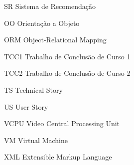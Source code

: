 \begin{siglas}
  \item[SR] Sistema de Recomendação
  \item[OO] Orientação a Objeto
  \item[ORM] Object-Relational Mapping
  \item[TCC1] Trabalho de Conclusão de Curso 1
  \item[TCC2] Trabalho de Conclusão de Curso 2
  \item[TS] Technical Story
  \item[US] User Story
  \item[VCPU] Video Central Processing Unit
  \item[VM] Virtual Machine
  \item[XML] Extensible Markup Language
\end{siglas}
